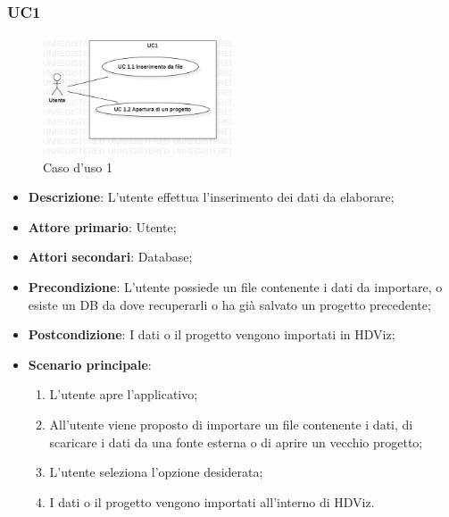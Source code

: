 \subsubsection{UC1}
\label{sub:uc1}

\begin{figure}[h]
    \centering
    \includegraphics[width=0.5\textwidth]{componenti/casi-duso/diagrammi/UC1.jpg}
    \caption{Caso d'uso 1}
    \label{fig:UC1}
\end{figure}


\begin{itemize}
    \item{\textbf{Descrizione}}: L'utente effettua l'inserimento dei dati da elaborare;
    \item{\textbf{Attore primario}}: Utente;
    \item{\textbf{Attori secondari}}: Database;
    \item{\textbf{Precondizione}}: L'utente possiede un file contenente i dati da importare, o esiste un DB da dove recuperarli o ha già salvato un progetto precedente;
    \item{\textbf{Postcondizione}}: I dati o il progetto vengono importati in HDViz;
    \item{\textbf{Scenario principale}}:
    \begin{enumerate}
        \item L'utente apre l'applicativo;
        \item All'utente viene proposto di importare un file contenente i dati, di scaricare i dati da una fonte esterna o di aprire un vecchio progetto;
        \item L'utente seleziona l'opzione desiderata;
        \item I dati o il progetto vengono importati all'interno di HDViz.
    \end{enumerate}
\end{itemize}

